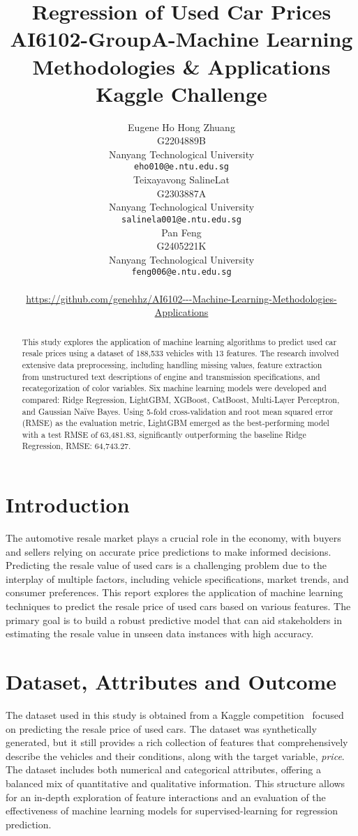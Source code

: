 \documentclass{article}
\title{
   \Large Regression of Used Car Prices \\[4mm]
   \normalsize AI6102-GroupA-Machine Learning Methodologies \& Applications \\[2mm]
   \normalsize Kaggle Challenge \\[2mm]
}
\author{
    Eugene Ho Hong Zhuang\\
    G2204889B\\
    Nanyang Technological University\\
    \texttt{eho010@e.ntu.edu.sg}\\
    \And
    Teixayavong SalineLat\\
    G2303887A\\
    Nanyang Technological University\\
    \texttt{salinela001@e.ntu.edu.sg}\\
    \And
    Pan Feng\\
    G2405221K\\
    Nanyang Technological University\\
    \texttt{feng006@e.ntu.edu.sg}\\
    \\[\baselineskip]  %
    \hfill\url{https://github.com/genehhz/AI6102---Machine-Learning-Methodologies-Applications}\hfill\mbox{}  %
}
\begin{document}
\maketitle


\begin{abstract}
This study explores the application of machine learning algorithms to predict used car resale prices using a dataset of 188,533 vehicles with 13 features. The research involved extensive data preprocessing, including handling missing values, feature extraction from unstructured text descriptions of engine and transmission specifications, and recategorization of color variables. Six machine learning models were developed and compared: Ridge Regression, LightGBM, XGBoost, CatBoost, Multi-Layer Perceptron, and Gaussian Na\"{i}ve Bayes. Using 5-fold cross-validation and root mean squared error (RMSE) as the evaluation metric, LightGBM emerged as the best-performing model with a test RMSE of 63,481.83, significantly outperforming the baseline Ridge Regression, RMSE: 64,743.27.
\end{abstract}


\section{Introduction}

The automotive resale market plays a crucial role in the economy, with buyers and sellers relying on accurate price predictions to make informed decisions. Predicting the resale value of used cars is a challenging problem due to the interplay of multiple factors, including vehicle specifications, market trends, and consumer preferences. This report explores the application of machine learning techniques to predict the resale price of used cars based on various features. The primary goal is to build a robust predictive model that can aid stakeholders in estimating the resale value in unseen data instances with high accuracy.

\section{Dataset, Attributes and Outcome}

The dataset used in this study is obtained from a Kaggle competition~\cite{playground-series-s4e9} focused on predicting the resale price of used cars. The dataset was synthetically generated, but it still provides a rich collection of features that comprehensively describe the vehicles and their conditions, along with the target variable, \textit{price}. The dataset includes both numerical and categorical attributes, offering a balanced mix of quantitative and qualitative information. This structure allows for an in-depth exploration of feature interactions and an evaluation of the effectiveness of machine learning models for supervised-learning for regression prediction.
\end{document}
